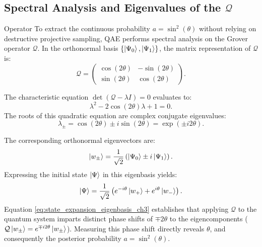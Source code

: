 \subsection{Spectral Analysis and Eigenvalues of the \texorpdfstring{$\mathcal{Q}$}{Q}} Operator
To extract the continuous probability $a = \sin^2(\theta)$ without relying on destructive projective sampling, QAE performs spectral analysis on the Grover operator $\mathcal{Q}$. In the orthonormal basis $\{\left|\Psi_0\right\rangle, \left|\Psi_1\right\rangle\}$, the matrix representation of $\mathcal{Q}$ is:
\begin{equation}
\mathcal{Q} = \begin{pmatrix} \cos(2\theta) & -\sin(2\theta) \\ \sin(2\theta) & \cos(2\theta) \end{pmatrix}.
\label{eq:grover_matrix_2d_ch3}
\end{equation}

The characteristic equation $\det(\mathcal{Q} - \lambda I) = 0$ evaluates to:
\begin{equation}
\lambda^2 - 2\cos(2\theta)\lambda + 1 = 0.
\label{eq:grover_characteristic_equation}
\end{equation}
The roots of this quadratic equation are complex conjugate eigenvalues:
\begin{equation}
\lambda_\pm = \cos(2\theta) \pm i \sin(2\theta) = \exp(\pm i 2\theta).
\label{eq:grover_eigenvalues_ch3}
\end{equation}

The corresponding orthonormal eigenvectors are:
\begin{equation}
\left|w_\pm\right\rangle = \frac{1}{\sqrt{2}} \left( \left|\Psi_0\right\rangle \pm i \left|\Psi_1\right\rangle \right).
\label{eq:grover_eigenvectors_ch3}
\end{equation}
Expressing the initial state $\left|\Psi\right\rangle$ in this eigenbasis yields:
\begin{equation}
\left|\Psi\right\rangle = \frac{1}{\sqrt{2}} \left( e^{-i\theta}\left|w_+\right\rangle + e^{i\theta}\left|w_-\right\rangle \right).
\label{eq:state_expansion_eigenbasis_ch3}
\end{equation}
Equation \eqref{eq:state_expansion_eigenbasis_ch3} establishes that applying $\mathcal{Q}$ to the quantum system imparts distinct phase shifts of $\mp 2\theta$ to the eigencomponents ($\mathcal{Q}\left|w_\pm\right\rangle = e^{\mp i 2\theta}\left|w_\pm\right\rangle$). Measuring this phase shift directly reveals $\theta$, and consequently the posterior probability $a = \sin^2(\theta)$.

